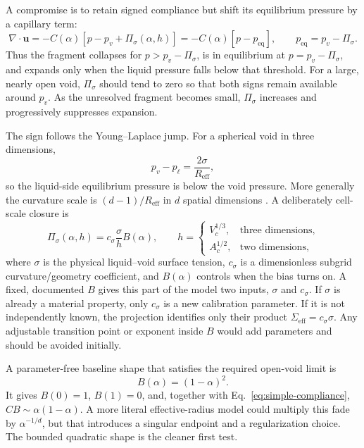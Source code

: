 \documentclass[11pt]{article}
\newcommand{\divg}{\nabla\!\cdot}
\newcommand{\uv}{\boldsymbol{u}}
\begin{document}
A compromise is to retain signed compliance but shift its equilibrium pressure by a
capillary term:
\begin{equation}
  \boxed{
  \divg\uv=-C(\alpha)
  \left[p-p_v+\Pi_\sigma(\alpha,h)\right]
  =-C(\alpha)\left[p-p_{\mathrm{eq}}\right],}
  \qquad
  p_{\mathrm{eq}}=p_v-\Pi_\sigma.
  \label{eq:capillary-signed}
\end{equation}
Thus the fragment collapses for \(p>p_v-\Pi_\sigma\), is in equilibrium at
\(p=p_v-\Pi_\sigma\), and expands only when the liquid pressure falls below that
threshold.  For a large, nearly open void, \(\Pi_\sigma\) should tend to zero so that
both signs remain available around \(p_v\).  As the unresolved fragment becomes small,
\(\Pi_\sigma\) increases and progressively suppresses expansion.

The sign follows the Young--Laplace jump.  For a spherical void in three dimensions,
\begin{equation}
  p_v-p_{\ell}=\frac{2\sigma}{R_{\mathrm{eff}}},
  \label{eq:young-laplace}
\end{equation}
so the liquid-side equilibrium pressure is below the void pressure.  More generally the
curvature scale is \((d-1)/R_{\mathrm{eff}}\) in \(d\) spatial dimensions
\cite{brackbill1992}.  A deliberately cell-scale closure is
\begin{equation}
  \boxed{
  \Pi_\sigma(\alpha,h)
  =c_\sigma\frac{\sigma}{h}B(\alpha),}
  \qquad
  h=\begin{cases}
       V_c^{1/3}, & \text{three dimensions},\\
       A_c^{1/2}, & \text{two dimensions},
     \end{cases}
  \label{eq:capillary-shift}
\end{equation}
where \(\sigma\) is the physical liquid--void surface tension, \(c_\sigma\) is a
dimensionless subgrid curvature/geometry coefficient, and \(B(\alpha)\) controls when
the bias turns on.  A fixed, documented \(B\) gives this part of the model two inputs,
\(\sigma\) and \(c_\sigma\).  If \(\sigma\) is already a material property, only
\(c_\sigma\) is a new calibration parameter.  If it is not independently known, the
projection identifies only their product
\(\Sigma_{\mathrm{eff}}=c_\sigma\sigma\).  Any adjustable transition point or exponent
inside \(B\) would add parameters and should be avoided initially.

A parameter-free baseline shape that satisfies the required open-void limit is
\begin{equation}
  \boxed{B(\alpha)=(1-\alpha)^2.}
  \label{eq:baseline-bias-shape}
\end{equation}
It gives \(B(0)=1\), \(B(1)=0\), and, together with
Eq.~\eqref{eq:simple-compliance}, \(C B\sim\alpha(1-\alpha)\).  A more literal
effective-radius model could multiply this fade by \(\alpha^{-1/d}\), but that introduces
a singular endpoint and a regularization choice.  The bounded quadratic shape is the
cleaner first test.
\end{document}
